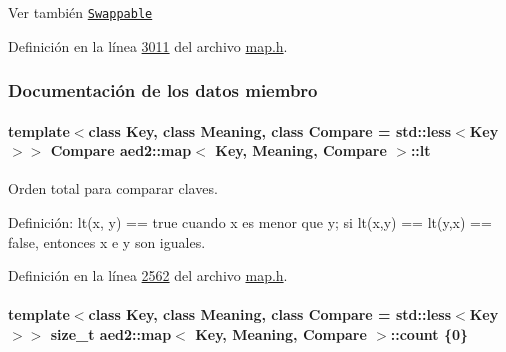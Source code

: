 \begin{DoxySeeAlso}{Ver también}
\href{http://en.cppreference.com/w/cpp/concept/Swappable}{\tt Swappable} 
\end{DoxySeeAlso}


Definición en la línea \hyperlink{map_8h_source_l03011}{3011} del archivo \hyperlink{map_8h_source}{map.\+h}.



\subsubsection{Documentación de los datos miembro}
\paragraph[{\texorpdfstring{lt}{lt}}]{\setlength{\rightskip}{0pt plus 5cm}template$<$class Key, class Meaning, class Compare = std\+::less$<$\+Key$>$$>$ Compare {\bf aed2\+::map}$<$ Key, Meaning, Compare $>$\+::lt\hspace{0.3cm}{\ttfamily [private]}}\hypertarget{classaed2_1_1map_a0e5be36fae0693e4665bd2a615e7550a_a0e5be36fae0693e4665bd2a615e7550a}{}\label{classaed2_1_1map_a0e5be36fae0693e4665bd2a615e7550a_a0e5be36fae0693e4665bd2a615e7550a}


Orden total para comparar claves. 

Definición\+: lt(x, y) == true cuando x es menor que y; si lt(x,y) == lt(y,x) == false, entonces x e y son iguales. 

Definición en la línea \hyperlink{map_8h_source_l02562}{2562} del archivo \hyperlink{map_8h_source}{map.\+h}.

\paragraph[{\texorpdfstring{count}{count}}]{\setlength{\rightskip}{0pt plus 5cm}template$<$class Key, class Meaning, class Compare = std\+::less$<$\+Key$>$$>$ size\+\_\+t {\bf aed2\+::map}$<$ Key, Meaning, Compare $>$\+::count \{0\}\hspace{0.3cm}{\ttfamily [private]}}\hypertarget{classaed2_1_1map_a44236c4f16cdc20a10759862b198bde4_a44236c4f16cdc20a10759862b198bde4}{}\label{classaed2_1_1map_a44236c4f16cdc20a10759862b198bde4_a44236c4f16cdc20a10759862b198bde4}


